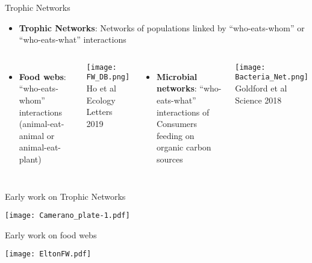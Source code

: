 \begin{frame}{Trophic Networks}

\begin{itemize}
  \item {\bf Trophic Networks}: Networks of populations linked by ``who-eats-whom'' or ``who-eats-what'' interactions 
\end{itemize} 

\begin{columns}[c]
  \pause
  \begin{itemize}
    \item {\bf Food webs}: ``who-eats-whom'' interactions (animal-eat-animal or animal-eat-plant)   
  \end{itemize}\small
  \centering    
  \texttt{[image: FW\_DB.png]}\\
    \vspace{-6pt}
    {\tiny Ho et al Ecology Letters 2019}
  \pause
  \begin{itemize}\small
    \item {\bf Microbial networks}: ``who-eats-what'' interactions of Consumers feeding on organic carbon sources
  \end{itemize}
  \centering
   \texttt{[image: Bacteria\_Net.png]}\\
   \vspace{-6pt}
   {\tiny Goldford et al Science 2018}
\end{columns}

\end{frame}
  
\begin{frame}{Early work on Trophic Networks }
  
\centering
      \texttt{[image: Camerano\_plate-1.pdf]} %
  
\end{frame}
  
  \begin{frame}{Early work on food webs}
      
    \centering
      \texttt{[image: EltonFW.pdf]} %
  
  \end{frame}
  
